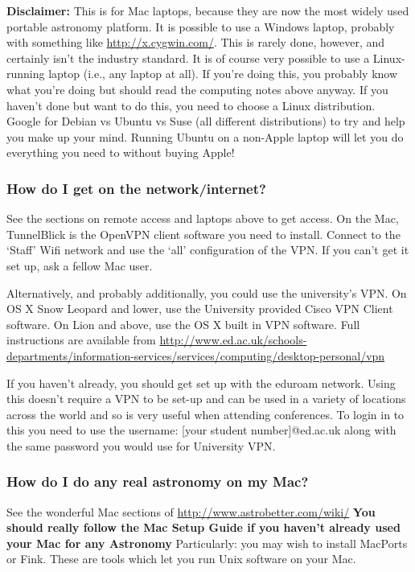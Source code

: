 {\bf{Disclaimer:}}
This is for Mac laptops, because they are now the most widely used portable astronomy platform.
It is possible to use a Windows laptop, probably with something like \url{http://x.cygwin.com/}.
This is rarely done, however, and certainly isn't the industry standard.
It is of course very possible to use a Linux-running laptop (i.e., any laptop at all).
If you're doing this, you probably know what you're doing but should read the computing notes above anyway.
If you haven't done but want to do this, you need to choose a Linux distribution. 
Google for Debian vs Ubuntu vs Suse (all different distributions) to try and help you make up your mind.
Running Ubuntu on a non-Apple laptop will let you do everything you need to without buying Apple!

\subsubsection{How do I get on the network/internet?}
See the sections on remote access and laptops above to get access. On the Mac, TunnelBlick is the OpenVPN client software you need to install. Connect to the `Staff' Wifi network and use the `all' configuration of the VPN.
If you can't get it set up, ask a fellow Mac user.

Alternatively, and probably additionally, you could use the university's VPN. On OS X Snow Leopard and lower, use the University provided Cisco VPN Client software. On Lion and above, use the OS X built in VPN software.
Full instructions are available from \url{http://www.ed.ac.uk/schools-departments/information-services/services/computing/desktop-personal/vpn}

If you haven't already, you should get set up with the eduroam network. Using this doesn't require a VPN to be set-up and can be used in a variety
of locations across the world and so is very useful when attending conferences. To login in to this you need to use the username: [your student number]@ed.ac.uk along with
the same password you would use for University VPN.


\subsubsection{How do I do any real astronomy on my Mac?}
See the wonderful Mac sections of \url{http://www.astrobetter.com/wiki/}
{\bf You should really follow the Mac Setup Guide if you haven't already used your Mac for any Astronomy}
Particularly: you may wish to install MacPorts or Fink. These are tools which let you run Unix software on your Mac.

